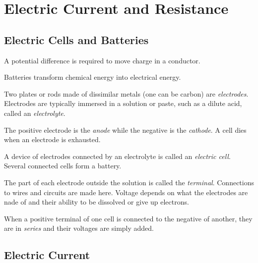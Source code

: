 \chapter{Electric Current and Resistance}

\section{Electric Cells and Batteries}

\begin{note}
    A potential difference is required to move charge in a conductor.
\end{note}
\begin{remark}
    Batteries transform chemical energy into electrical energy.
\end{remark}
\begin{definition}
    Two plates or rods made of dissimilar metals (one can be carbon) are \emph{electrodes}. Electrodes are typically immersed in a solution or paste, such as a dilute acid, called an \emph{electrolyte}.

    The positive electrode is the \emph{anode} while the negative is the \emph{cathode}. A cell dies when an electrode is exhausted.
\end{definition}
\begin{definition}
    A device of electrodes connected by an electrolyte is called an \emph{electric cell}. Several connected cells form a battery.
\end{definition}
\begin{definition}[Terminal]
    The part of each electrode outside the solution is called the \emph{terminal}. Connections to wires and circuits are made here. Voltage depends on what the electrodes are nade of and their ability to be dissolved or give up electrons.
\end{definition}
\begin{remark}
    When a positive terminal of one cell is connected to the negative of another, they are in \emph{series} and their voltages are simply added.
\end{remark}

\section{Electric Current}

